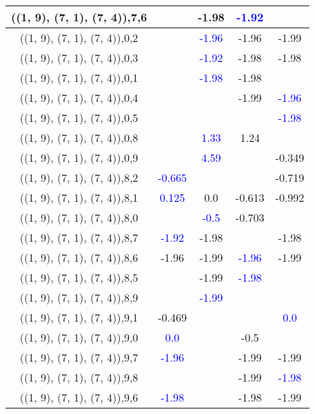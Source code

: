 \documentclass{article}
\begin{document}
\begin{center}
\begin{longtable}{|c|c|c|c|c|}
        	\hline
        	((1, 9), (7, 1), (7, 4)),7,6&&-1.98& \textcolor{blue}{-1.92}&\\
        	\hline
        	((1, 9), (7, 1), (7, 4)),0,2&& \textcolor{blue}{-1.96}&-1.96&-1.99\\
        	\hline
        	((1, 9), (7, 1), (7, 4)),0,3&& \textcolor{blue}{-1.92}&-1.98&-1.98\\
        	\hline
        	((1, 9), (7, 1), (7, 4)),0,1&& \textcolor{blue}{-1.98}&-1.98&\\
        	\hline
        	((1, 9), (7, 1), (7, 4)),0,4&&&-1.99& \textcolor{blue}{-1.96}\\
        	\hline
        	((1, 9), (7, 1), (7, 4)),0,5&&&& \textcolor{blue}{-1.98}\\
        	\hline
        	((1, 9), (7, 1), (7, 4)),0,8&& \textcolor{blue}{1.33}&1.24&\\
        	\hline
        	((1, 9), (7, 1), (7, 4)),0,9&& \textcolor{blue}{4.59}&&-0.349\\
        	\hline
        	((1, 9), (7, 1), (7, 4)),8,2& \textcolor{blue}{-0.665}&&&-0.719\\
        	\hline
        	((1, 9), (7, 1), (7, 4)),8,1& \textcolor{blue}{0.125}&0.0&-0.613&-0.992\\
        	\hline
        	((1, 9), (7, 1), (7, 4)),8,0&& \textcolor{blue}{-0.5}&-0.703&\\
        	\hline
        	((1, 9), (7, 1), (7, 4)),8,7& \textcolor{blue}{-1.92}&-1.98&&-1.98\\
        	\hline
        	((1, 9), (7, 1), (7, 4)),8,6&-1.96&-1.99& \textcolor{blue}{-1.96}&-1.99\\
        	\hline
        	((1, 9), (7, 1), (7, 4)),8,5&&-1.99& \textcolor{blue}{-1.98}&\\
        	\hline
        	((1, 9), (7, 1), (7, 4)),8,9&& \textcolor{blue}{-1.99}&&\\
        	\hline
        	((1, 9), (7, 1), (7, 4)),9,1&-0.469&&& \textcolor{blue}{0.0}\\
        	\hline
        	((1, 9), (7, 1), (7, 4)),9,0& \textcolor{blue}{0.0}&&-0.5&\\
        	\hline
        	((1, 9), (7, 1), (7, 4)),9,7& \textcolor{blue}{-1.96}&&-1.99&-1.99\\
        	\hline
        	((1, 9), (7, 1), (7, 4)),9,8&&&-1.99& \textcolor{blue}{-1.98}\\
        	\hline
        	((1, 9), (7, 1), (7, 4)),9,6& \textcolor{blue}{-1.98}&&-1.98&-1.99\\

\end{longtable}
\end{center}
\end{document}
